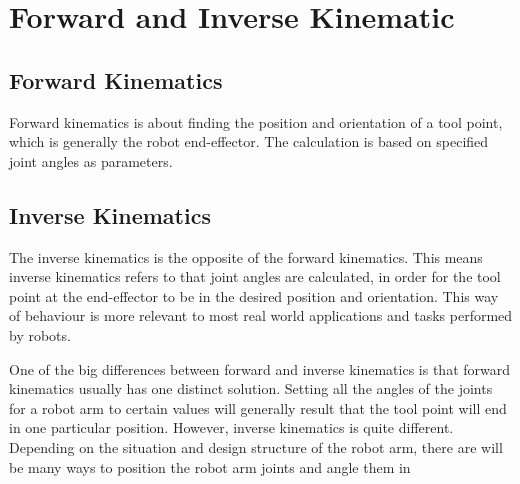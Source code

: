 \section{Forward and Inverse Kinematic}

\subsection{Forward Kinematics}

Forward kinematics is about finding the position and orientation of a tool point, which is generally the robot end-effector. The calculation is based on specified joint angles as parameters. 

\subsection{Inverse Kinematics}

The inverse kinematics is the opposite of the forward kinematics. This means inverse kinematics refers to that joint angles are calculated, in order for the tool point at the end-effector to be in the desired position and orientation. This way of behaviour is more relevant to most real world applications and tasks performed by robots.

One of the big differences between forward and inverse kinematics is that forward kinematics usually has one distinct solution. Setting all the angles of the joints for a robot arm to certain values will generally result that the tool point will end in one particular position. However, inverse kinematics is quite different. Depending on the situation and design structure of the robot arm, there are will be many ways to position the robot arm joints and angle them in

